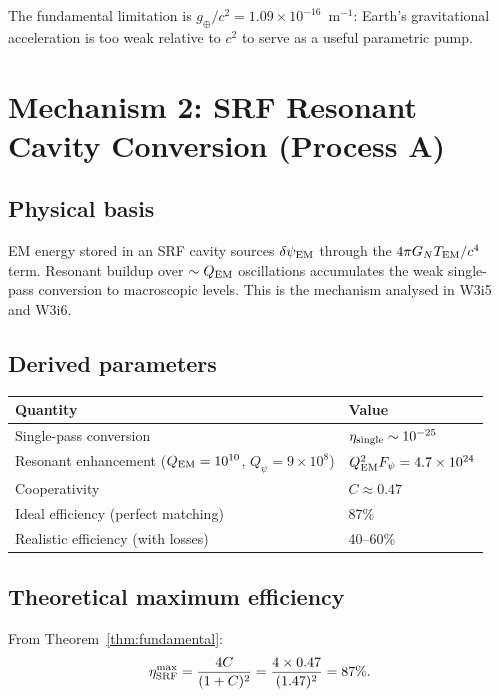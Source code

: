\documentclass[11pt]{article}
\newcommand{\ee}[1]{\times 10^{#1}}
\newcommand{\dpsiEM}{\delta\psi_{\rm EM}}
\newcommand{\Qpsi}{Q_\psi}
\newcommand{\QEM}{Q_{\rm EM}}
\newcommand{\GN}{G_N}
\newcommand{\Fpsi}{F_\psi}
\begin{document}
The fundamental limitation is $g_\oplus/c^2 = 1.09\ee{-16}$~m$^{-1}$:
Earth's gravitational acceleration is too weak relative to $c^2$ to
serve as a useful parametric pump.

\section{Mechanism 2: SRF Resonant Cavity Conversion (Process A)}
\label{sec:mech-SRF}

\subsection{Physical basis}

EM energy stored in an SRF cavity sources $\dpsiEM$ through the
$4\pi\GN T_{\rm EM}/c^4$ term. Resonant buildup over $\sim \QEM$
oscillations accumulates the weak single-pass conversion to macroscopic
levels. This is the mechanism analysed in W3i5 and W3i6.

\subsection{Derived parameters}

\begin{center}
\begin{tabular}{ll}
\toprule
Quantity & Value \\
\midrule
Single-pass conversion & $\eta_{\rm single} \sim 10^{-25}$ \\
Resonant enhancement ($\QEM = 10^{10}$, $\Qpsi = 9\ee{8}$)
  & $\QEM^2 \Fpsi = 4.7\ee{24}$ \\
Cooperativity & $C \approx 0.47$ \\
Ideal efficiency (perfect matching) & 87\% \\
Realistic efficiency (with losses) & 40--60\% \\
\bottomrule
\end{tabular}
\end{center}

\subsection{Theoretical maximum efficiency}

From Theorem~\ref{thm:fundamental}:
\begin{equation}
\eta_{\rm SRF}^{\rm max} = \frac{4C}{(1+C)^2}
= \frac{4\times 0.47}{(1.47)^2} = 87\%.
\label{eq:eta-SRF-max}
\end{equation}
\end{document}

